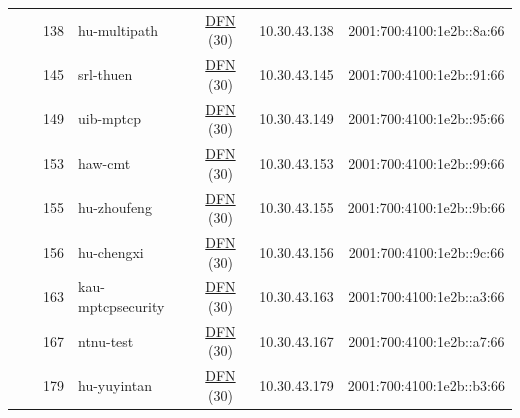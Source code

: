 \begin{small}
\begin{center}
\begin{longtable}{|c|c|c|c|c|c|c|c|}
  &  & \tiny{138} & \multicolumn{1}{|l|}{\tiny{hu-multipath}} & \multicolumn{2}{|c|}{\tiny{\href{https://www.dfn.de}{DFN} (30)}} & \tiny{10.30.43.138} & \tiny{2001:700:4100:1e2b::8a:66} \\* \cline{3-3}\cline{4-4}\cline{5-5}\cline{6-6}\cline{7-7}\cline{8-8}
  &  & \tiny{145} & \multicolumn{1}{|l|}{\tiny{srl-thuen}} & \multicolumn{2}{|c|}{\tiny{\href{https://www.dfn.de}{DFN} (30)}} & \tiny{10.30.43.145} & \tiny{2001:700:4100:1e2b::91:66} \\* \cline{3-3}\cline{4-4}\cline{5-5}\cline{6-6}\cline{7-7}\cline{8-8}
  &  & \tiny{149} & \multicolumn{1}{|l|}{\tiny{uib-mptcp}} & \multicolumn{2}{|c|}{\tiny{\href{https://www.dfn.de}{DFN} (30)}} & \tiny{10.30.43.149} & \tiny{2001:700:4100:1e2b::95:66} \\* \cline{3-3}\cline{4-4}\cline{5-5}\cline{6-6}\cline{7-7}\cline{8-8}
  &  & \tiny{153} & \multicolumn{1}{|l|}{\tiny{haw-cmt}} & \multicolumn{2}{|c|}{\tiny{\href{https://www.dfn.de}{DFN} (30)}} & \tiny{10.30.43.153} & \tiny{2001:700:4100:1e2b::99:66} \\* \cline{3-3}\cline{4-4}\cline{5-5}\cline{6-6}\cline{7-7}\cline{8-8}
  &  & \tiny{155} & \multicolumn{1}{|l|}{\tiny{hu-zhoufeng}} & \multicolumn{2}{|c|}{\tiny{\href{https://www.dfn.de}{DFN} (30)}} & \tiny{10.30.43.155} & \tiny{2001:700:4100:1e2b::9b:66} \\* \cline{3-3}\cline{4-4}\cline{5-5}\cline{6-6}\cline{7-7}\cline{8-8}
  &  & \tiny{156} & \multicolumn{1}{|l|}{\tiny{hu-chengxi}} & \multicolumn{2}{|c|}{\tiny{\href{https://www.dfn.de}{DFN} (30)}} & \tiny{10.30.43.156} & \tiny{2001:700:4100:1e2b::9c:66} \\* \cline{3-3}\cline{4-4}\cline{5-5}\cline{6-6}\cline{7-7}\cline{8-8}
  &  & \tiny{163} & \multicolumn{1}{|l|}{\tiny{kau-mptcpsecurity}} & \multicolumn{2}{|c|}{\tiny{\href{https://www.dfn.de}{DFN} (30)}} & \tiny{10.30.43.163} & \tiny{2001:700:4100:1e2b::a3:66} \\* \cline{3-3}\cline{4-4}\cline{5-5}\cline{6-6}\cline{7-7}\cline{8-8}
  &  & \tiny{167} & \multicolumn{1}{|l|}{\tiny{ntnu-test}} & \multicolumn{2}{|c|}{\tiny{\href{https://www.dfn.de}{DFN} (30)}} & \tiny{10.30.43.167} & \tiny{2001:700:4100:1e2b::a7:66} \\* \cline{3-3}\cline{4-4}\cline{5-5}\cline{6-6}\cline{7-7}\cline{8-8}
  &  & \tiny{179} & \multicolumn{1}{|l|}{\tiny{hu-yuyintan}} & \multicolumn{2}{|c|}{\tiny{\href{https://www.dfn.de}{DFN} (30)}} & \tiny{10.30.43.179} & \tiny{2001:700:4100:1e2b::b3:66} \\* \cline{3-3}\cline{4-4}\cline{5-5}\cline{6-6}\cline{7-7}\cline{8-8}

\end{longtable}
\end{center}
\end{small}
